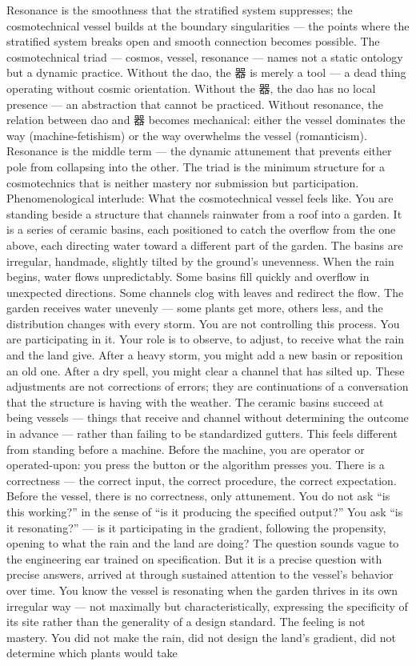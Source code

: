 Resonance is the smoothness that the stratified system suppresses; the cosmotechnical vessel builds at the boundary singularities — the points where the stratified system breaks open and smooth connection becomes possible. The cosmotechnical triad — cosmos, vessel, resonance — names not a static ontology but a dynamic practice. Without the dao, the 器 is merely a tool — a dead thing operating without cosmic orientation. Without the 器, the dao has no local presence — an abstraction that cannot be practiced. Without resonance, the relation between dao and 器 becomes mechanical: either the vessel dominates the way (machine-fetishism) or the way overwhelms the vessel (romanticism). Resonance is the middle term — the dynamic attunement that prevents either pole from collapsing into the other. The triad is the minimum structure for a cosmotechnics that is neither mastery nor submission but participation. Phenomenological interlude: What the cosmotechnical vessel feels like. You are standing beside a structure that channels rainwater from a roof into a garden. It is a series of ceramic basins, each positioned to catch the overflow from the one above, each directing water toward a different part of the garden. The basins are irregular, handmade, slightly tilted by the ground’s unevenness. When the rain begins, water flows unpredictably. Some basins fill quickly and overflow in unexpected directions. Some channels clog with leaves and redirect the flow. The garden receives water unevenly — some plants get more, others less, and the distribution changes with every storm. You are not controlling this process. You are participating in it. Your role is to observe, to adjust, to receive what the rain and the land give. After a heavy storm, you might add a new basin or reposition an old one. After a dry spell, you might clear a channel that has silted up. These adjustments are not corrections of errors; they are continuations of a conversation that the structure is having with the weather. The ceramic basins succeed at being vessels — things that receive and channel without determining the outcome in advance — rather than failing to be standardized gutters. This feels different from standing before a machine. Before the machine, you are operator or operated-upon: you press the button or the algorithm presses you. There is a correctness — the correct input, the correct procedure, the correct expectation. Before the vessel, there is no correctness, only attunement. You do not ask “is this working?” in the sense of “is it producing the specified output?” You ask “is it resonating?” — is it participating in the gradient, following the propensity, opening to what the rain and the land are doing? The question sounds vague to the engineering ear trained on specification. But it is a precise question with precise answers, arrived at through sustained attention to the vessel’s behavior over time. You know the vessel is resonating when the garden thrives in its own irregular way — not maximally but characteristically, expressing the specificity of its site rather than the generality of a design standard. The feeling is not mastery. You did not make the rain, did not design the land’s gradient, did not determine which plants would take 